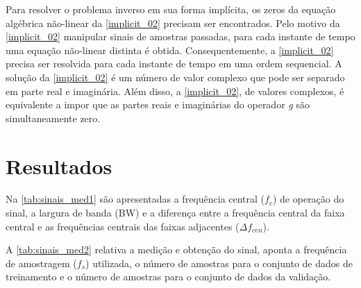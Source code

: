 Para resolver o problema inverso em sua forma implícita, os zeros da equação algébrica não-linear da \autoref{implicit_02} precisam ser encontrados. Pelo motivo da \autoref{implicit_02} manipular sinais de amostras passadas, para cada instante de tempo uma equação não-linear distinta é obtida. Consequentemente, a \autoref{implicit_02} precisa ser resolvida para cada instante de tempo em uma ordem sequencial. A solução da \autoref{implicit_02} é um número de valor complexo que pode ser separado em parte real e imaginária. Além disso, a \autoref{implicit_02}, de valores complexos, é equivalente a impor que as partes reais e imaginárias do operador \textit{g} são simultaneamente zero.

\section{Resultados} \label{sec:estudoii-3}

Na \autoref{tab:sinais_med1} são apresentadas a frequência central ($f_{c}$) de operação do sinal, a largura de banda (BW) e a diferença entre a frequência central da faixa central e as frequências centrais das faixas adjacentes ($\Delta f_{cen}$).

A \autoref{tab:sinais_med2} relativa a medição e obtenção do sinal, aponta a frequência de amostragem ($f_{s}$) utilizada, o número de amostras para o conjunto de dados de treinamento e o número de amostras para o conjunto de dados da validação.

